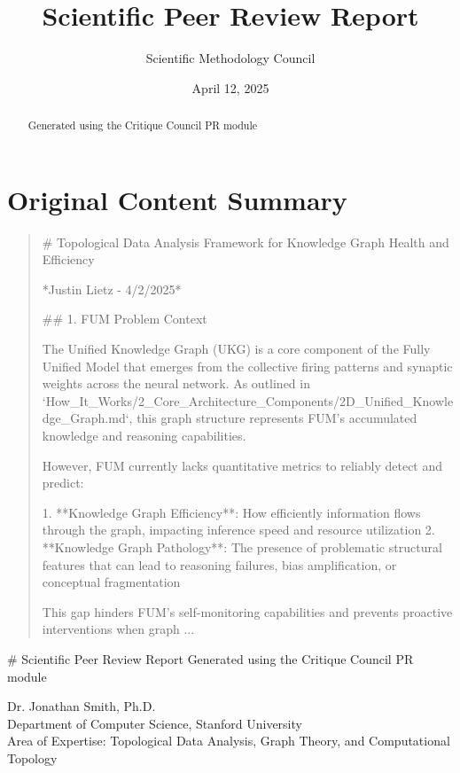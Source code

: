 \documentclass[12pt]{article}
\title{Scientific Peer Review Report}
\author{Scientific Methodology Council}
\date{April 12, 2025}
\begin{document}
\maketitle

\begin{abstract}
Generated using the Critique Council PR module
\end{abstract}

\section{Original Content Summary}
\begin{quote}
\# Topological Data Analysis Framework for Knowledge Graph Health and Efficiency

*Justin Lietz - 4/2/2025*

\#\# 1. FUM Problem Context

The Unified Knowledge Graph (UKG) is a core component of the Fully Unified Model that emerges from the collective firing patterns and synaptic weights across the neural network. As outlined in `How\_It\_Works/2\_Core\_Architecture\_Components/2D\_Unified\_Knowledge\_Graph.md`, this graph structure represents FUM's accumulated knowledge and reasoning capabilities.

However, FUM currently lacks quantitative metrics to reliably detect and predict:

1.  **Knowledge Graph Efficiency**: How efficiently information flows through the graph, impacting inference speed and resource utilization
2.  **Knowledge Graph Pathology**: The presence of problematic structural features that can lead to reasoning failures, bias amplification, or conceptual fragmentation

This gap hinders FUM's self-monitoring capabilities and prevents proactive interventions when graph ...
\end{quote}

\# Scientific Peer Review Report
Generated using the Critique Council PR module

\hrulefill
\begin{center}
\large
Dr. Jonathan Smith, Ph.D. \\
Department of Computer Science, Stanford University \\
Area of Expertise: Topological Data Analysis, Graph Theory, and Computational Topology \\
\end{center}
\vspace{1em}
\end{document}
